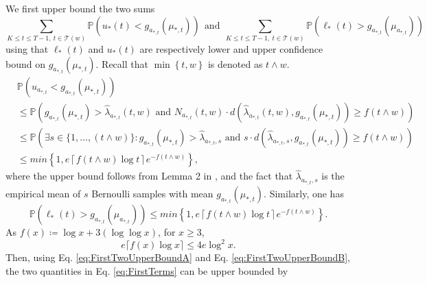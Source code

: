 \documentclass[letterpaper]{article} %
\newcommand{\bP}{\mathds{P}}
\newcommand{\defined}{\coloneqq}
\newcommand{\optArm}[1]{a_{*, #1}}
\newcommand{\optMean}[1]{\mu_{*, #1}}
\newcommand{\noChange}{\mathcal{T}}
\newcommand{\windowsize}{w}
\begin{document}
We first upper bound the two sums 
\begin{equation}\sum_{K \leq t \leq T-1, \ t \in \noChange(\windowsize)} \mathds{P}\left(u_*(t) < g_{\optArm{t}}(\optMean{t})\right) \ \ \text{and} \ \ \sum_{K \leq t \leq T-1, \ t \in \noChange(\windowsize)} \mathds{P}\left(\ell_*(t) > g_{\optArm{t}}(\mu_{\optArm{t}})\right)\label{eq:FirstTerms}\end{equation}
using that  $\ell_*(t)$ and $u_*(t)$ are respectively lower and upper confidence bound on $g_{\optArm{t}}(\optMean{t})$. Recall that $\min\left\{ t, \windowsize\right\}$ is denoted as $t \wedge \windowsize$. 
\begin{align}
& \bP\left(u_{\optArm{t}} < g_{\optArm{t}}(\optMean{t})\right) \nonumber \\
%
& \leq  \bP\left(g_{\optArm{t}}(\optMean{t}) > \hat{\lambda}_{\optArm{t}}(t, \windowsize) \text{ and } N_{\optArm{t}}(t, \windowsize) \cdot  d\left(\hat{\lambda}_{\optArm{t}}(t, \windowsize), g_{\optArm{t}}(\optMean{t})\right) \geq f\left( t \wedge \windowsize\right)\right) \nonumber \\
%
& \leq \bP\left(\exists s \in \{1,\dots, (t \wedge \windowsize)\} :  g_{\optArm{t}}(\optMean{t}) > \hat{\lambda}_{\optArm{t},s} \text{ and } s \cdot d(\hat{\lambda}_{\optArm{t},s}, g_{\optArm{t}}(\optMean{t})) \geq f\left( t \wedge \windowsize\right)\right) \nonumber \\
%
& \leq  min\left\{ 1, e \left \lceil f\left( t \wedge \windowsize\right) \log{t} \right \rceil e^{-f\left( t \wedge \windowsize\right)} \right\} \label{eq:FirstTwoUpperBoundA},
\end{align}
where the upper bound follows from Lemma 2 in \citet{KLUCBJournal}, and the fact that $\hat{\lambda}_{\optArm{t},s}$ is the empirical mean of $s$ Bernoulli samples with mean $g_{\optArm{t}}(\optMean{t})$.
Similarly, one has 
\begin{equation}
\mathds{P}\left(\ell_*(t) > g_{\optArm{t}}(\mu_{\optArm{t}})\right)  \leq  min\left\{ 1, e \left \lceil f\left( t \wedge \windowsize\right) \log{t} \right \rceil e^{-f\left( t \wedge \windowsize\right)} \right\}. \label{eq:FirstTwoUpperBoundB}
\end{equation}
As $f(x) \defined \log{x} + 3(\log{\log{x}})$, for $x\geq3$,
\[e \lceil f(x) \log{x} \rceil \leq 4e \log^2{x}.\]
Then, using Eq. \eqref{eq:FirstTwoUpperBoundA} and Eq. \eqref{eq:FirstTwoUpperBoundB}, the two quantities in Eq. \eqref{eq:FirstTerms} can be upper bounded by 
\end{document}
